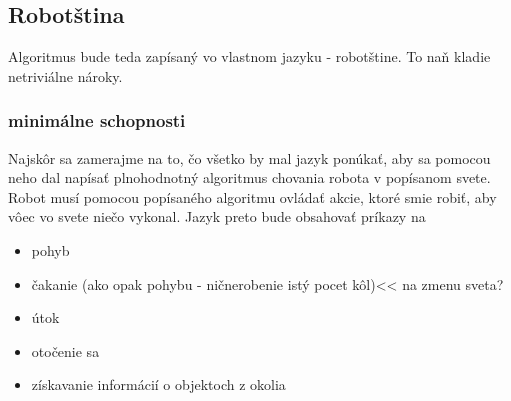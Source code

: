 \subsection{Robotština}
Algoritmus bude teda zapísaný vo vlastnom jazyku - robotštine. To naň kladie netriviálne nároky.
\subsubsection{minimálne schopnosti}
Najskôr sa zamerajme na to, čo všetko by mal jazyk ponúkať, aby sa pomocou neho dal napísať plnohodnotný algoritmus chovania robota v popísanom svete. \\
Robot musí pomocou popísaného algoritmu ovládať akcie, ktoré smie robiť, aby vôec vo svete niečo vykonal. Jazyk preto bude obsahovať príkazy na 
\begin{itemize}
\item pohyb 
\item čakanie (ako opak pohybu - ničnerobenie istý pocet kôl)<< na zmenu sveta?
\item útok
\item otočenie sa
\item získavanie informácií o objektoch z okolia
\end{itemize} %

